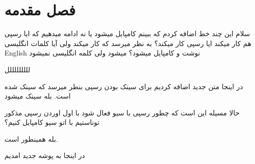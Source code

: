 ﻿\chapter{فصل مقدمه} 
\newpage
سلام این چند خط اضافه کردم که ببینم کامپایل میشود یا نه
ادامه میدهیم که ایا رسپی هم کار میکند
ایا رسپی کار میکند؟
به نظر میرسد که کار میکند ولی آیا کلمات انگلیسی English نوشت و کامپایل میشود؟
میشود ولی کلمه انگلیسی نمیشود

لللللللللل

در اینجا متن جدید اضافه کردیم برای سینک بودن رسپی
بنطر میرسد که سینک شده است.
بله سینک میشود

حالا مسیله این است که چطور رسپی با سیو فعال شود
با اول اوردن رسپی مذکور توناستیم با اتو سیو کامپایل کنیم؟

بله همینطور است.

در اینجا به پوشه جدید امدیم
